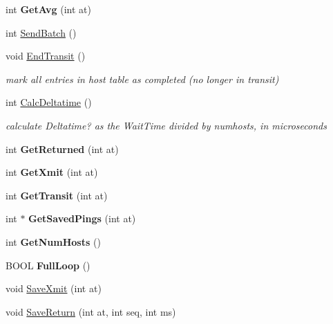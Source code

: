 \begin{CompactItemize}
\item 
\hypertarget{classWinMTRNet_c61a4bb5633cc2dcf26cfc606b1e6ccf}{
int \textbf{GetAvg} (int at)}
\label{classWinMTRNet_c61a4bb5633cc2dcf26cfc606b1e6ccf}

\item 
int \hyperlink{classWinMTRNet_f12b703c5d313be05f98316c720ce808}{SendBatch} ()
\item 
\hypertarget{classWinMTRNet_c07a4aa12873781e06b03d9282ccc84b}{
void \hyperlink{classWinMTRNet_c07a4aa12873781e06b03d9282ccc84b}{EndTransit} ()}
\label{classWinMTRNet_c07a4aa12873781e06b03d9282ccc84b}

\begin{CompactList}\small\item\em mark all entries in host table as completed (no longer in transit) \item\end{CompactList}\item 
\hypertarget{classWinMTRNet_e5b56522d653d3f3478da67e28fa8027}{
int \hyperlink{classWinMTRNet_e5b56522d653d3f3478da67e28fa8027}{CalcDeltatime} ()}
\label{classWinMTRNet_e5b56522d653d3f3478da67e28fa8027}

\begin{CompactList}\small\item\em calculate Deltatime? as the WaitTime divided by numhosts, in microseconds \item\end{CompactList}\item 
\hypertarget{classWinMTRNet_2fcd7c0312f298e0bff9fb38e04436ee}{
int \textbf{GetReturned} (int at)}
\label{classWinMTRNet_2fcd7c0312f298e0bff9fb38e04436ee}

\item 
\hypertarget{classWinMTRNet_5861925957509eb4d204170a735d71c7}{
int \textbf{GetXmit} (int at)}
\label{classWinMTRNet_5861925957509eb4d204170a735d71c7}

\item 
\hypertarget{classWinMTRNet_94d93285a666841e088bf53d9de05389}{
int \textbf{GetTransit} (int at)}
\label{classWinMTRNet_94d93285a666841e088bf53d9de05389}

\item 
\hypertarget{classWinMTRNet_73d2f412eaf1fa078e64e5dca184a314}{
int $\ast$ \textbf{GetSavedPings} (int at)}
\label{classWinMTRNet_73d2f412eaf1fa078e64e5dca184a314}

\item 
\hypertarget{classWinMTRNet_cf30bb1acb859892bc02021c36f79868}{
int \textbf{GetNumHosts} ()}
\label{classWinMTRNet_cf30bb1acb859892bc02021c36f79868}

\item 
\hypertarget{classWinMTRNet_708e722ceb3e03a1df35d7440cf6c41d}{
BOOL \textbf{FullLoop} ()}
\label{classWinMTRNet_708e722ceb3e03a1df35d7440cf6c41d}

\item 
void \hyperlink{classWinMTRNet_1c19487407ac366b7f5f07bf78b183d6}{SaveXmit} (int at)
\item 
void \hyperlink{classWinMTRNet_7d99bed3982761bdcaea919af7c84e18}{SaveReturn} (int at, int seq, int ms)
\end{CompactItemize}
